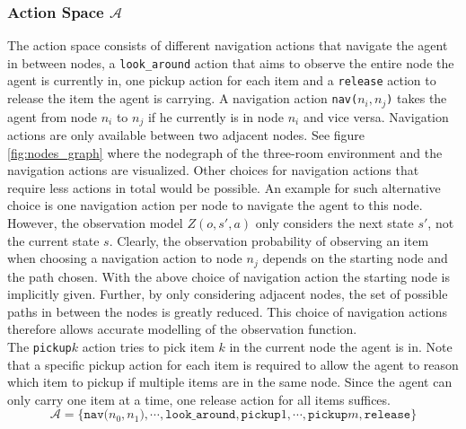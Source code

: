 \subsubsection{Action Space $\mathcal{A}$}
The action space consists of different navigation actions that navigate the agent in between nodes, a \texttt{look\_around} action that aims to observe the entire node the agent is currently in, one pickup action for each item and a \texttt{release} action to release the item the agent is carrying. A navigation action \texttt{nav($n_i, n_j$)} takes the agent from node $n_i$ to $n_j$ if he currently is in node $n_i$ and vice versa. Navigation actions are only available between two adjacent nodes. See figure \ref{fig:nodes_graph} where the nodegraph of the three-room environment and the navigation actions are visualized. Other choices for navigation actions that require less actions in total would be possible. An example for such alternative choice is one navigation action per node to navigate the agent to this node. However, the observation model $Z(o, s', a)$ only considers the next state $s'$, not the current state $s$. Clearly, the observation probability of observing an item when choosing a navigation action to node $n_j$ depends on the starting node and the path chosen. With the above choice of navigation action the starting node is implicitly given. Further, by only considering adjacent nodes, the set of possible paths in between the nodes is greatly reduced. This choice of navigation actions therefore allows accurate modelling of the observation function.\\
The \texttt{pickup$k$} action tries to pick item $k$ in the current node the agent is in. Note that a specific pickup action for each item is required to allow the agent to reason which item to pickup if multiple items are in the same node. Since the agent can only carry one item at a time, one release action for all items suffices. 
\begin{equation}
    \mathcal{A} = \{\texttt{nav($n_0, n_1$)}, \cdots, \texttt{look\_around}, \texttt{pickup$1$}, \cdots, \texttt{pickup$m$}, \texttt{release}\}
\end{equation}
